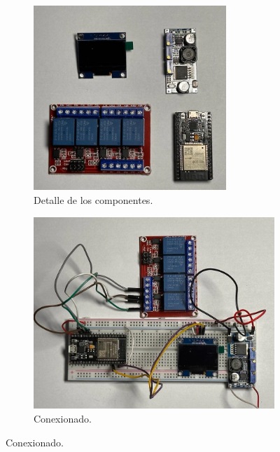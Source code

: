 \begin{figure}[!h]
     \centering
     \begin{subfigure}[b]{0.45\textwidth}
		\centering
		\includegraphics[width=0.8\textwidth]{./Figures/control_riego1.jpg}
		\caption[Detalle de los componentes]{Detalle de los componentes.}
		\label{fig:riego1}
     \end{subfigure}
     \hfill
     \begin{subfigure}[b]{0.45\textwidth}
	\centering
		\includegraphics[width=1\textwidth]{./Figures/control_riego2.jpg}
		\caption[Conexionado]{Conexionado.}
		\label{fig:riego2}
     \end{subfigure}

\end{figure}
